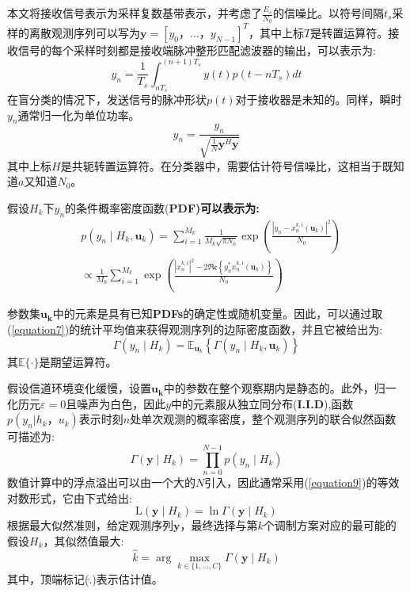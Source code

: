 \documentclass[final]{cvpr}
\begin{document}
本文将接收信号表示为采样复数基带表示，并考虑了$\frac{E_s}{N_0}$的信噪比。以符号间隔$t_s$采样的离散观测序列可以写为$\mathbf{y}=[y_0，\dots，y_{N−1}]^T$，其中上标$T$是转置运算符。接收信号的每个采样时刻都是接收端脉冲整形匹配滤波器的输出，可以表示为:
\begin{equation}
y_{n}=\frac{1}{T_{s}} \int_{n T_{s}}^{(n+1) T_{s}} y(t) p\left(t-n T_{s}\right) d t \label{equation5}
\end{equation}
在盲分类的情况下，发送信号的脉冲形状$p(t)$对于接收器是未知的。同样，瞬时$y_n$通常归一化为单位功率。
\begin{equation}
y_{n}=\frac{y_{n}}{\sqrt{\frac{1}{N} \mathbf{y}^{H} \mathbf{y}}}\label{equation6}
\end{equation}
其中上标$H$是共轭转置运算符。在分类器中，需要估计符号信噪比，这相当于既知道$a$又知道$N_0$。

假设$H_k$下$y_n$的条件概率密度函数(\bf PDF\rm)可以表示为:
\begin{equation}
\begin{aligned}
&p\left(y_{n} \mid H_{k}, \mathbf{u}_{k}\right) =\sum_{i=1}^{M_{k}} \frac{1}{M_{k} \sqrt{\pi N_{0}}} \exp \left(\frac{\left|y_{n}-x_{n}^{k, i}\left(\mathbf{u}_{k}\right)\right|^{2}}{N_{0}}\right) \\
& \propto \frac{1}{M_{k}} \sum_{i=1}^{M_{k}} \exp \left(\frac{\left|x_{n}^{k, i}\right|^{2}-2 \Re \mathfrak{e}\left\{y_{n}^{*} x_{n}^{k, i}\left(\mathbf{u}_{k}\right)\right\}}{N_{0}}\right)
\end{aligned}\label{equation7}
\end{equation}

参数集$\mathbf{u_k}$中的元素是具有已知\textbf{PDFs}的确定性或随机变量。因此，可以通过取(\ref{equation7})的统计平均值来获得观测序列的边际密度函数，并且它被给出为:
\begin{equation}
\Gamma\left(y_{n} \mid H_{k}\right)=\mathbb{E}_{\mathbf{u}_{k}}\left\{\Gamma\left(y_{n} \mid H_{k}, \mathbf{u}_{k}\right)\right\}\label{equation8}
\end{equation}
其$\mathbb{E}\{·\}$是期望运算符。

假设信道环境变化缓慢，设置$\mathbf{u_k}$中的参数在整个观察期内是静态的。此外，归一化历元$\varepsilon=0$且噪声为白色，因此$y$中的元素服从独立同分布(\textbf{I.I.D}),函数$p(y_n|h_k，u_k)$表示时刻$n$处单次观测的概率密度，整个观测序列的联合似然函数可描述为:
\begin{equation}
\Gamma\left(\mathbf{y} \mid H_{k}\right)=\prod_{n=0}^{N-1} p\left(y_{n} \mid H_{k}\right)\label{equation9}
\end{equation}
数值计算中的浮点溢出可以由一个大的$N$引入，因此通常采用(\ref{equation9})的等效对数形式，它由下式给出:
\begin{equation}
\mathrm{L}\left(\mathbf{y} \mid H_{k}\right)=\ln \Gamma\left(\mathbf{y} \mid H_{k}\right)\label{equation10}
\end{equation}
根据最大似然准则，给定观测序列$\mathbf{y}$，最终选择与第$k$个调制方案对应的最可能的假设$H_k$，其似然值最大:
\begin{equation}
\widehat{k}=\arg \max _{k \in\{1, \ldots, C\}} \Gamma\left(\mathbf{y} \mid H_{k}\right)\label{equation11}
\end{equation}
其中，顶端标记($\widehat{.}$)表示估计值。
\end{document}
